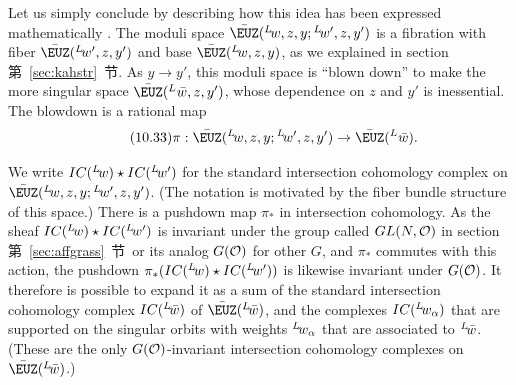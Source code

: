 Let us simply conclude by describing how this idea has been
expressed mathematically \cite{ref97,ref98}.  The  moduli
space $\bar\EUZ({}^L\negthinspace w,z,y;{}^L\negthinspace
w',z,y')$ is a fibration with fiber $\bar\EUZ ({}^L\negthinspace
w',z,y')$ and base $\bar\EUZ({}^L\negthinspace w,z,y)$, as we
explained in section 第~\ref{sec:kahstr}~节. As $y\to y'$, this moduli space is
``blown down'' to make the more singular space
$\bar\EUZ({}^L\negthinspace\,\bar w,z,y')$, whose dependence on
$z$ and $y'$ is inessential. The blowdown is a rational map
\begin{equation*}
\tag*{(10.33)}
\pi:\bar\EUZ({}^L\negthinspace w,z,y;{}^L\negthinspace
w',z,y')\to \bar\EUZ({}^L\negthinspace\,\bar w).
\end{equation*}

We write $IC({}^L\negthinspace w)\star IC({}^L\negthinspace w')$
for the standard intersection cohomology complex on
$\bar\EUZ({}^L\negthinspace w,z,y;{}^L\negthinspace w',z,y')$.
(The notation is motivated by the fiber bundle structure of this
space.)  There is a pushdown map $\pi_*$ in intersection
cohomology.  As the sheaf $IC({}^L\negthinspace w)\star
IC({}^L\negthinspace w')$ is invariant under the group called
$GL(N,{\cal O})$ in section 第~\ref{sec:affgrass}~节\ or its analog $G({\cal O})$
for other $G$, and $\pi_*$ commutes with this action, the pushdown
$\pi_*(IC({}^L\negthinspace w)\star IC({}^L\negthinspace w'))$ is
likewise invariant under $G({\cal O})$.  It therefore is possible
to expand it as a sum of the standard intersection cohomology
complex $IC({}^L\negthinspace\bar w)$ of
$\bar\EUZ({}^L\negthinspace\bar w)$, and the complexes
$IC({}^L\negthinspace w_\alpha)$ that are supported on the
singular orbits with weights $^L\negthinspace w_\alpha$ that are
associated to $^L\negthinspace\bar w$.  (These are the only
$G({\cal O})$-invariant intersection cohomology complexes on
$\bar\EUZ({}^L\negthinspace\bar w)$.)

